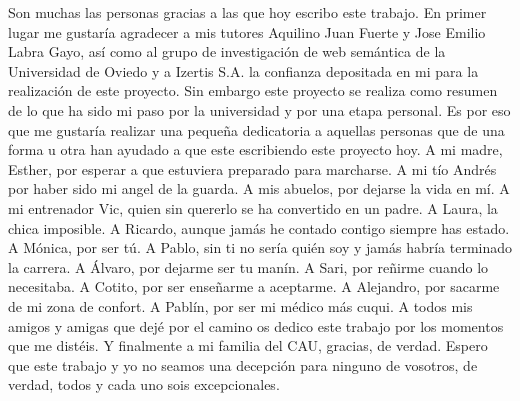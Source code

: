 \begin{kaobox}[frametitle=Spanish]
	Son muchas las personas gracias a las que hoy escribo este trabajo. En primer lugar me gustaría agradecer a mis tutores Aquilino Juan Fuerte y Jose Emilio Labra Gayo, así como al grupo de investigación de web semántica de la Universidad de Oviedo y a Izertis S.A. la confianza depositada en mi para la realización de este proyecto.
	Sin embargo este proyecto se realiza como resumen de lo que ha sido mi paso por la universidad y por una etapa personal. Es por eso que me gustaría realizar una pequeña dedicatoria a aquellas personas que de una forma u otra han ayudado a que este escribiendo este proyecto hoy. A mi madre, Esther, por esperar a que estuviera preparado para marcharse. A mi tío Andrés por haber sido mi angel de la guarda. A mis abuelos, por dejarse la vida en mí. A mi entrenador Vic, quien sin quererlo se ha convertido en un padre. A Laura, la chica imposible. A Ricardo, aunque jamás he contado contigo siempre has estado. A Mónica, por ser tú. A Pablo, sin ti no sería quién soy y jamás habría terminado la carrera. A Álvaro, por dejarme ser tu manín. A Sari, por reñirme cuando lo necesitaba. A Cotito, por ser enseñarme a aceptarme. A Alejandro, por sacarme de mi zona de confort. A Pablín, por ser mi médico más cuqui. A todos mis amigos y amigas que dejé por el camino os dedico este trabajo por los momentos que me distéis. Y finalmente a mi familia del CAU, gracias, de verdad.
	Espero que este trabajo y yo no seamos una decepción para ninguno de vosotros, de verdad, todos y cada uno sois excepcionales.
\end{kaobox}